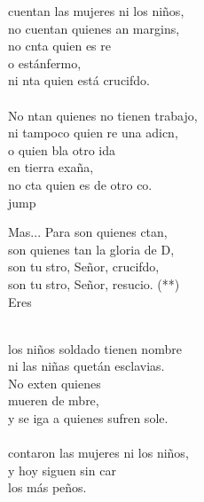 \begin{cancion}%
	cuentan las mujeres ni los niños,\\
	no cuentan quienes an margins,\\
	no cnta quien es re \\
	o estánfermo,\\
	ni nta quien está crucifdo.\\
	\jump\\
	No ntan quienes no tienen trabajo,\\
	ni tampoco quien re una adicn, \\
	o quien bla otro ida \\
	en tierra exaña,\\
	no cta quien es de otro co.\\jump\\
	\begin{chorus}%
	Mas... Para  son quienes ctan,\\
	son quienes tan la gloria de D,\\
	son tu stro, Señor, crucifdo,\\
	son tu stro, Señor, resucio. (**)\\
	Eres  \\
	\end{chorus}%
	\jump\\
	los niños soldado tienen nombre\\
	ni las niñas quetán esclavias.\\
	No exten quienes \\
	 mueren de mbre,\\
	y se iga a quienes sufren sole.\\
	\jump\\
	contaron las mujeres ni los niños,\\
	y hoy siguen sin car \\
	los más peños.\\

\end{cancion}
